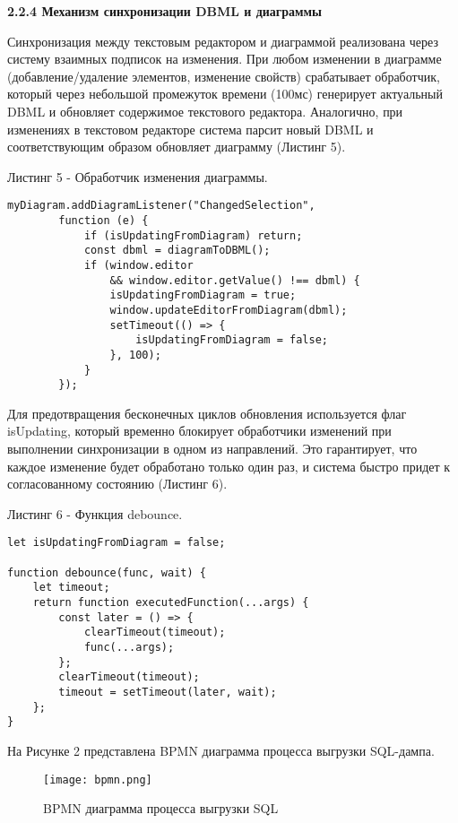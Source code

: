 \textbf{2.2.4 Механизм синхронизации DBML и диаграммы}

Синхронизация между текстовым редактором и диаграммой реализована через систему взаимных подписок на изменения. При любом изменении в диаграмме (добавление/удаление элементов, изменение свойств) срабатывает обработчик, который через небольшой промежуток времени (100мс) генерирует актуальный DBML и обновляет содержимое текстового редактора. Аналогично, при изменениях в текстовом редакторе система парсит новый DBML и соответствующим образом обновляет диаграмму (Листинг 5).

Листинг 5 - Обработчик изменения диаграммы.
\begin{lstlisting}[frame=single]
    myDiagram.addDiagramListener("ChangedSelection",
        function (e) {
            if (isUpdatingFromDiagram) return;
            const dbml = diagramToDBML();
            if (window.editor
                && window.editor.getValue() !== dbml) {
                isUpdatingFromDiagram = true;
                window.updateEditorFromDiagram(dbml);
                setTimeout(() => {
                    isUpdatingFromDiagram = false;
                }, 100);
            }
        });
\end{lstlisting}

Для предотвращения бесконечных циклов обновления используется флаг isUpdating, который временно блокирует обработчики изменений при выполнении синхронизации в одном из направлений. Это гарантирует, что каждое изменение будет обработано только один раз, и система быстро придет к согласованному состоянию (Листинг 6).

Листинг 6 - Функция debounce.
\begin{lstlisting}[frame=single]
let isUpdatingFromDiagram = false;

function debounce(func, wait) {
    let timeout;
    return function executedFunction(...args) {
        const later = () => {
            clearTimeout(timeout);
            func(...args);
        };
        clearTimeout(timeout);
        timeout = setTimeout(later, wait);
    };
}
\end{lstlisting}

На Рисунке 2 представлена BPMN диаграмма процесса выгрузки SQL-дампа.

\renewcommand{\figurename}{Рисунок}
\begin{figure}[htbp]
    \centering %
    \texttt{[image: bpmn.png]} 
    \caption{BPMN диаграмма процесса выгрузки SQL}
    \label{fig:analyze} %
\end{figure}


